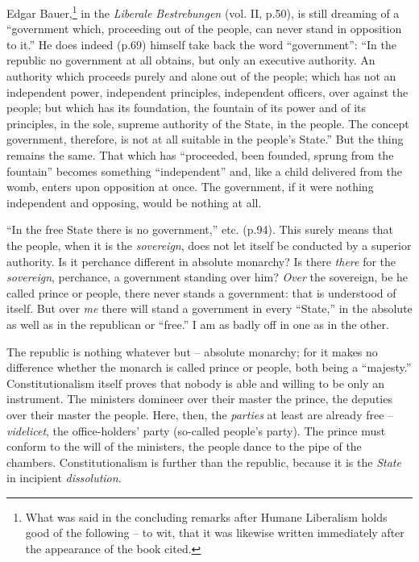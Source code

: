 Edgar Bauer,\footnote{What was said in the concluding remarks after Humane 
Liberalism holds good of the following -- to wit, that it was likewise written 
immediately after the appearance of the book cited.} in the \textit{Liberale 
Bestrebungen} (vol. II, p.50), is still dreaming of a ``government which, 
proceeding out of the people, can never stand in opposition to it.'' He does 
indeed (p.69) himself take back the word ``government'': ``In the republic 
no government at all obtains, but only an executive authority. An authority 
which proceeds purely and alone out of the people; which has not an 
independent power, independent principles, independent officers, over against 
the people; but which has its foundation, the fountain of its power and of its 
principles, in the sole, supreme authority of the State, in the people. The 
concept government, therefore, is not at all suitable in the people's 
State.'' But the thing remains the same. That which has ``proceeded, been 
founded, sprung from the fountain'' becomes something ``independent'' and, 
like a child delivered from the womb, enters upon opposition at once. The 
government, if it were nothing independent and opposing, would be nothing at 
all.

``In the free State there is no government,'' etc. (p.94). This surely means 
that the people, when it is the \textit{sovereign}, does not let itself be 
conducted by a superior authority. Is it perchance different in absolute 
monarchy? Is there \textit{there} for the \textit{sovereign}, perchance, a 
government standing over him? \textit{Over} the sovereign, be he called prince 
or people, there never stands a government: that is understood of itself. But 
over \textit{me} there will stand a government in every ``State,'' in the 
absolute as well as in the republican or ``free.'' I am as badly off in one 
as in the other.

The republic is nothing whatever but -- absolute monarchy; for it makes no 
difference whether the monarch is called prince or people, both being a 
``majesty.'' Constitutionalism itself proves that nobody is able and willing 
to be only an instrument. The ministers domineer over their master the prince, 
the deputies over their master the people. Here, then, the \textit{parties} at 
least are already free -- \textit{videlicet}, the office-holders' party 
(so-called people's party). The prince must conform to the will of the 
ministers, the people dance to the pipe of the chambers. Constitutionalism is 
further than the republic, because it is the \textit{State} in incipient 
\textit{dissolution}.

